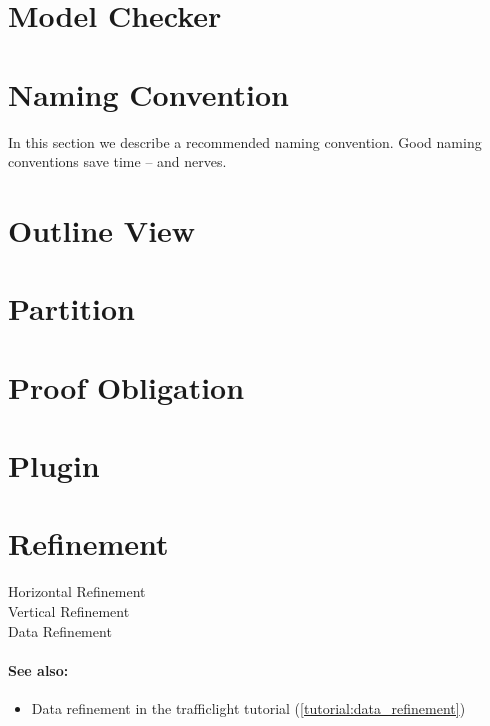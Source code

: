 \section{Model Checker}
\label{model_checker}

\section{Naming Convention}
\label{naming_convention}

In this section we describe a recommended naming convention.  Good naming conventions save time -- and nerves.

\section{Outline View}
\label{outline_view}

\section{Partition}
\label{partition}

\section{Proof Obligation}
\label{proof_obligation}

\section{Plugin}
\label{plugin}

\section{Refinement}
\label{refinement}

\begin{description}
	\item[Horizontal Refinement]
	\item[Vertical Refinement]
	\item[Data Refinement]
\end{description}

\paragraph*{See also:}
\begin{itemize}
\item Data refinement in the trafficlight tutorial (\ref{tutorial:data_refinement})
\end{itemize}

